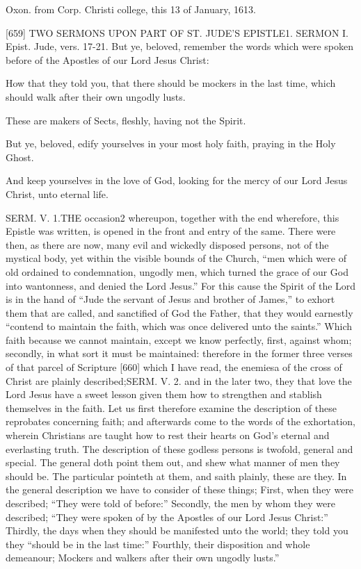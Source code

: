 Oxon. from Corp. Christi college, this 13 of January, 1613.

[659]
TWO SERMONS UPON PART OF ST. JUDE’S EPISTLE1.
SERMON I.
Epist. Jude, vers. 17-21.
But ye, beloved, remember the words which were spoken before of the Apostles of our Lord Jesus Christ:

How that they told you, that there should be mockers in the last time, which should walk after their own ungodly lusts.

These are makers of Sects, fleshly, having not the Spirit.

But ye, beloved, edify yourselves in your most holy faith, praying in the Holy Ghost.

And keep yourselves in the love of God, looking for the mercy of our Lord Jesus Christ, unto eternal life.

SERM. V. 1.THE occasion2 whereupon, together with the end wherefore, this Epistle was written, is opened in the front and entry of the same. There were then, as there are now, many evil and wickedly disposed persons, not of the mystical body, yet within the visible bounds of the Church, “men which were of old ordained to condemnation, ungodly men, which turned the grace of our God into wantonness, and denied the Lord Jesus.” For this cause the Spirit of the Lord is in the hand of “Jude the servant of Jesus and brother of James,” to exhort them that are called, and sanctified of God the Father, that they would earnestly “contend to maintain the faith, which was once delivered unto the saints.” Which faith because we cannot maintain, except we know perfectly, first, against whom; secondly, in what sort it must be maintained: therefore in the former three verses of that parcel of Scripture [660] which I have read, the enemiesa of the cross of Christ are plainly described;SERM. V. 2. and in the later two, they that love the Lord Jesus have a sweet lesson given them how to strengthen and stablish themselves in the faith. Let us first therefore examine the description of these reprobates concerning faith; and afterwards come to the words of the exhortation, wherein Christians are taught how to rest their hearts on God’s eternal and everlasting truth. The description of these godless persons is twofold, general and special. The general doth point them out, and shew what manner of men they should be. The particular pointeth at them, and saith plainly, these are they. In the general description we have to consider of these things; First, when they were described; “They were told of before:” Secondly, the men by whom they were described; “They were spoken of by the Apostles of our Lord Jesus Christ:” Thirdly, the days when they should be manifested unto the world; they told you they “should be in the last time:” Fourthly, their disposition and whole demeanour; Mockers and walkers after their own ungodly lusts.”

